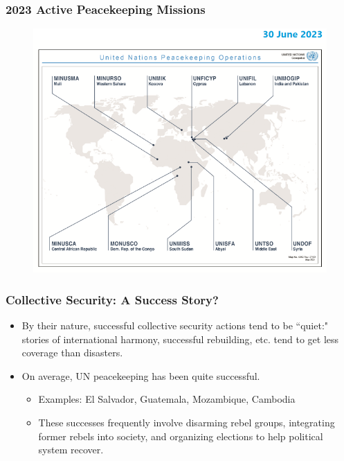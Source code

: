 \documentclass[handout]{beamer}
\begin{document}
\begin{frame} 
	\frametitle{\LARGE{2023 Active Peacekeeping Missions}}
	\begin{figure}[ht!]
		\centering
		\includegraphics[width=\textwidth,height=\textheight,keepaspectratio]{UNpeacekeeping.png}
	\end{figure}
\end{frame}	

\begin{frame} 
	\frametitle{\LARGE{Collective Security: A Success Story?}}
	\begin{itemize}
		\item By their nature, successful collective security actions tend to be ``quiet:" stories of international harmony, successful rebuilding, etc. tend to get less coverage than disasters. \pause
		\item On average, UN peacekeeping has been quite successful.
		\begin{itemize}
			\item Examples: El Salvador, Guatemala, Mozambique, Cambodia
			\item These successes frequently involve disarming rebel groups, integrating former rebels into society, and organizing elections to help political system recover.
		\end{itemize}
	\end{itemize}
\end{frame}
\end{document}
